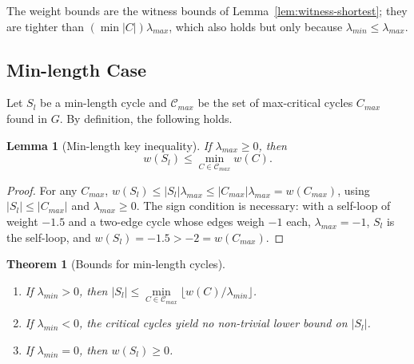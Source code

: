 \documentclass{article}
\newtheorem{thm}{Theorem}[section]
\newtheorem{lem}{Lemma}[section]
\theoremstyle{definition}
\begin{document}
The weight bounds are the witness bounds of
Lemma~\ref{lem:witness-shortest}; they are tighter than $(\min |C|)
\lambda_{max}$, which also holds but only because $\lambda_{min} \leq
\lambda_{max}$.

\subsection{Min-length Case}
\label{sec:min-length-case}

Let $S_l$ be a min-length cycle and $\mathcal{C}_{max}$ be the set of
max-critical cycles $C_{max}$ found in $G$. By definition, the following
holds.

\begin{lem}[Min-length key inequality]
  \label{lem:min-length-key}
  If $\lambda_{max} \geq 0$, then
  \begin{equation*}
    w(S_l) \leq \min\limits_{C \in \mathcal{C}_{max}} w(C).
  \end{equation*}
\end{lem}

\begin{proof}
For any $C_{max}$, $w(S_l) \leq |S_l|\lambda_{max} \leq
|C_{max}|\lambda_{max} = w(C_{max})$, using $|S_l| \leq |C_{max}|$ and
$\lambda_{max} \geq 0$. The sign condition is necessary: with a
self-loop of weight $-1.5$ and a two-edge cycle whose edges weigh $-1$
each, $\lambda_{max} = -1$, $S_l$ is the self-loop, and $w(S_l) = -1.5
> -2 = w(C_{max})$.
\end{proof}

\begin{thm}[Bounds for min-length cycles]
  \label{thm:minlength-bounds}
\mbox{}\par
\begin{enumerate}
\item If $\lambda_{min} > 0$, then
  $|S_l| \leq \min\limits_{C \in \mathcal{C}_{max}} \lfloor w(C) / \lambda_{min} \rfloor$.
\item If $\lambda_{min} < 0$, the critical cycles yield no
  non-trivial lower bound on $|S_l|$.
\item If $\lambda_{min} = 0$, then
  $w(S_l) \geq 0$.
\end{enumerate}
\end{thm}
\end{document}
